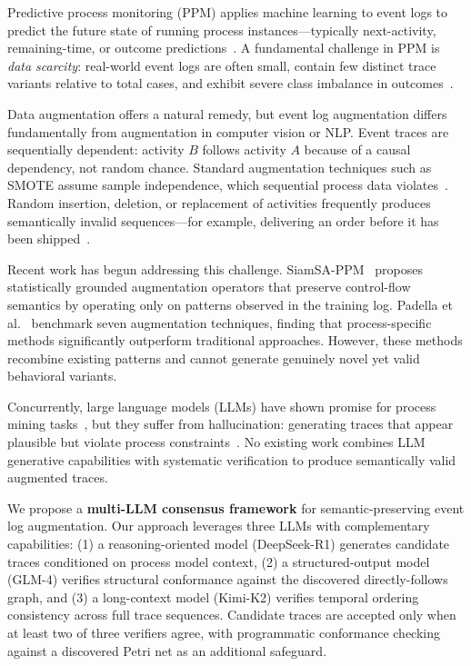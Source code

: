 \documentclass[11pt,a4paper]{article}
\begin{document}
Predictive process monitoring (PPM) applies machine learning to event logs to predict the future state of running process instances---typically next-activity, remaining-time, or outcome predictions~\cite{teinemaa2019outcome}. A fundamental challenge in PPM is \emph{data scarcity}: real-world event logs are often small, contain few distinct trace variants relative to total cases, and exhibit severe class imbalance in outcomes~\cite{vanstraten2025siamsa}.

Data augmentation offers a natural remedy, but event log augmentation differs fundamentally from augmentation in computer vision or NLP. Event traces are sequentially dependent: activity $B$ follows activity $A$ because of a causal dependency, not random chance. Standard augmentation techniques such as SMOTE assume sample independence, which sequential process data violates~\cite{padella2025comparison}. Random insertion, deletion, or replacement of activities frequently produces semantically invalid sequences---for example, delivering an order before it has been shipped~\cite{vanstraten2025siamsa}.

Recent work has begun addressing this challenge. SiamSA-PPM~\cite{vanstraten2025siamsa} proposes statistically grounded augmentation operators that preserve control-flow semantics by operating only on patterns observed in the training log. Padella et al.~\cite{padella2025comparison} benchmark seven augmentation techniques, finding that process-specific methods significantly outperform traditional approaches. However, these methods recombine existing patterns and cannot generate genuinely novel yet valid behavioral variants.

Concurrently, large language models (LLMs) have shown promise for process mining tasks~\cite{berti2024pmllm,rebmann2024evaluating}, but they suffer from hallucination: generating traces that appear plausible but violate process constraints~\cite{rebmann2024evaluating}. No existing work combines LLM generative capabilities with systematic verification to produce semantically valid augmented traces.

We propose a \textbf{multi-LLM consensus framework} for semantic-preserving event log augmentation. Our approach leverages three LLMs with complementary capabilities: (1) a reasoning-oriented model (DeepSeek-R1) generates candidate traces conditioned on process model context, (2) a structured-output model (GLM-4) verifies structural conformance against the discovered directly-follows graph, and (3) a long-context model (Kimi-K2) verifies temporal ordering consistency across full trace sequences. Candidate traces are accepted only when at least two of three verifiers agree, with programmatic conformance checking against a discovered Petri net as an additional safeguard.
\end{document}
